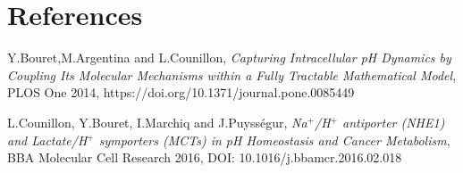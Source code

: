 \documentclass[aps,11pt]{revtex4}
\begin{document}
\section{References}
\begin{thebibliography}{1}

	Y.Bouret,M.Argentina and L.Counillon,
	\textit{Capturing Intracellular pH Dynamics by Coupling Its Molecular Mechanisms within a Fully Tractable Mathematical Model},
	PLOS One 2014,
	https://doi.org/10.1371/journal.pone.0085449


	L.Counillon, Y.Bouret, I.Marchiq and J.Puyss\'egur,
	\textit{{Na$^+$/H$^+$ antiporter (NHE1) and Lactate/H$^+$ symporters (MCTs)
	 in pH Homeostasis and Cancer Metabolism}},
	 BBA Molecular Cell Research 2016,
	 DOI: 10.1016/j.bbamcr.2016.02.018

\end{thebibliography}
\end{document}
